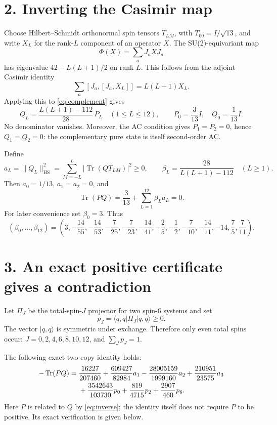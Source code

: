 \documentclass[11pt]{article}
\newcommand{\Tr}{\operatorname{Tr}}
\newcommand{\HS}{\mathrm{HS}}
\begin{document}
\section*{2. Inverting the Casimir map}
Choose Hilbert--Schmidt orthonormal spin tensors $T_{LM}$, with $T_{00}=I/\sqrt{13}$, and write $X_L$ for the rank-$L$ component of an operator $X$. The SU(2)-equivariant map
\[
 \Phi(X)=\sum_aJ_aXJ_a
\]
has eigenvalue $42-L(L+1)/2$ on rank $L$. This follows from the adjoint Casimir identity
\[
 \sum_a[J_a,[J_a,X_L]]=L(L+1)X_L.
\]
Applying this to \eqref{eq:complement} gives
\begin{equation}
 Q_L=\frac{L(L+1)-112}{28}\,P_L\quad(1\le L\le12),
 \qquad P_0=\frac3{13}I,\quad Q_0=\frac1{13}I.
 \label{eq:inverse}
\end{equation}
No denominator vanishes. Moreover, the AC condition gives $P_1=P_2=0$, hence $Q_1=Q_2=0$: the complementary pure state is itself second-order AC.

Define
\[
 a_L=\|Q_L\|_{\HS}^2=\sum_{M=-L}^L|\Tr(QT_{LM})|^2\ge0,
 \qquad
 \beta_L=\frac{28}{L(L+1)-112}\quad(L\ge1).
\]
Then $a_0=1/13$, $a_1=a_2=0$, and
\begin{equation}
 \Tr(PQ)=\frac3{13}+\sum_{L=1}^{12}\beta_La_L=0.
 \label{eq:orthogonality}
\end{equation}
For later convenience set $\beta_0=3$. Thus
\[
 (\beta_0,\ldots,\beta_{12})=
 \left(3,-\frac{14}{55},-\frac{14}{53},-\frac7{25},-\frac7{23},
 -\frac{14}{41},-\frac25,-\frac12,-\frac7{10},-\frac{14}{11},
 -14,\frac75,\frac7{11}\right).
\]

\section*{3. An exact positive certificate gives a contradiction}
Let $\Pi_J$ be the total-spin-$J$ projector for two spin-6 systems and set
\[
 p_J=\langle q,q|\Pi_J|q,q\rangle\ge0.
\]
The vector $|q,q\rangle$ is symmetric under exchange. Therefore only even total spins occur: $J=0,2,4,6,8,10,12$, and $\sum_Jp_J=1$.

The following exact two-copy identity holds:
\begin{align}
 -\Tr(PQ)={}&\frac{16227}{207460}
 +\frac{609427}{82984}a_1
 -\frac{28005159}{1999160}a_2
 +\frac{210951}{23575}a_3 \notag\\
 &+\frac{3542643}{103730}p_0
 +\frac{819}{4715}p_2
 +\frac{2907}{460}p_6.
 \label{eq:certificate}
\end{align}
Here $P$ is related to $Q$ by \eqref{eq:inverse}; the identity itself does not require $P$ to be positive. Its exact verification is given below.
\end{document}
